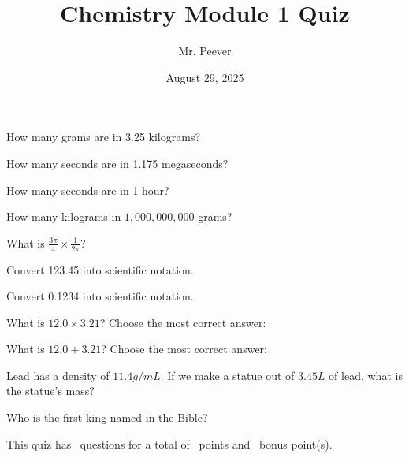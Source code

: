 \documentclass[11pt,addpoints]{exam}   	%
\title{Chemistry Module 1 Quiz}
\author{Mr. Peever}
\date{August 29, 2025}							%
\begin{document}
\maketitle

\pointsinrightmargin

\begin{center}
\end{center}
\vspace{0.1in}
\vspace{0.2in}

\begin{questions}

\question[1]
How many grams are in 3.25 kilograms?

\question[1]
How many seconds are in 1.175 megaseconds?

\question[1]
How many seconds are in 1 hour?

\question[1]
How many kilograms in $1,000,000,000$ grams?

\question[1]
What is  $\frac{3 \pi}{4} \times \frac{1}{2 \pi}$?

\question[1]
Convert 123.45 into scientific notation.

\question[1]
Convert 0.1234 into scientific notation.

\question[1]
What is $ 12.0 \times 3.21 $? Choose the most correct answer:

\begin{choices}
\end{choices}
\vspace{.2in}

\pagebreak

\question[1]
What is $ 12.0 + 3.21 $? Choose the most correct answer:

\begin{choices}
\end{choices}


\question[1]
Lead has a density of $11.4 g/mL$. If we make a statue out of $3.45 L$ of lead, what is the statue's mass?

\vspace{1in}
\bonusquestion[1]
Who is the first king named in the Bible?

\end{questions}

\vspace{2in}

\begin{center}
This quiz has \numquestions\ questions for a total of \numpoints\ points and \numbonuspoints\ bonus point(s).
\end{center}
\end{document}
